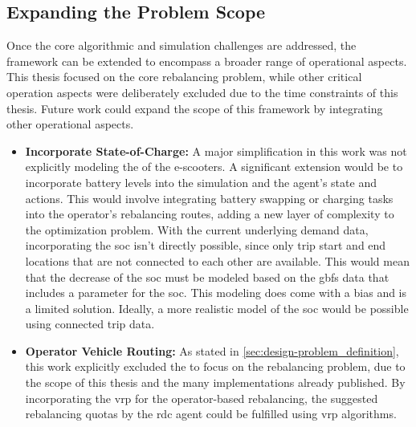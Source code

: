 \subsection{Expanding the Problem Scope}
Once the core algorithmic and simulation challenges are addressed, the framework can be extended to encompass a broader range of operational aspects.
This thesis focused on the core rebalancing problem, while other critical operation aspects were deliberately excluded due to the time constraints of this thesis.
Future work could expand the scope of this framework by integrating other operational aspects.
\begin{itemize}
    \item \textbf{Incorporate State-of-Charge:}
        A major simplification in this work was not explicitly modeling the  of the e-scooters.
        A significant extension would be to incorporate battery levels into the simulation and the agent's state and actions.
        This would involve integrating battery swapping or charging tasks into the operator's rebalancing routes, adding a new layer of complexity to the optimization problem.
        With the current underlying demand data, incorporating the \gls{soc} isn't directly possible, since only trip start and end locations that are not connected to each other are available.
        This would mean that the decrease of the \gls{soc} must be modeled based on the \gls{gbfs} data that includes a parameter for the \gls{soc}.
        This modeling does come with a bias and is a limited solution.
        Ideally, a more realistic model of the \gls{soc} would be possible using connected trip data.
    \item \textbf{Operator Vehicle Routing:}
        As stated in \autoref{sec:design-problem_definition}, this work explicitly excluded the  to focus on the rebalancing problem, due to the scope of this thesis and the many implementations already published.
        By incorporating the \gls{vrp} for the operator-based rebalancing, the suggested rebalancing quotas by the \gls{rdc} agent could be fulfilled using \gls{vrp} algorithms.
\end{itemize}
